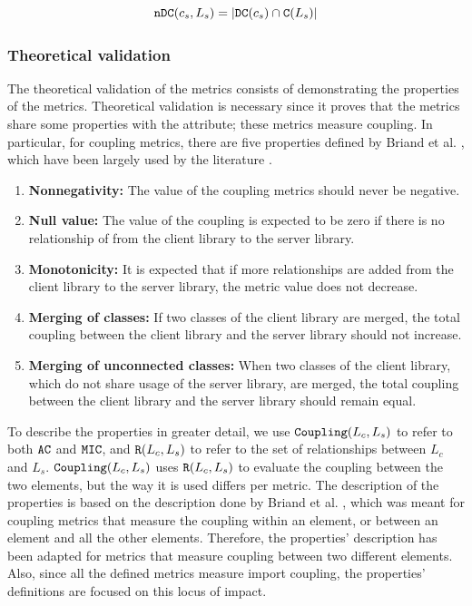 \begin{equation}
\label{eqn:ac-ndc}
    \verb|nDC|(c_s, L_s) = |\verb|DC|(c_s) \cap \verb|C|(L_s)|
\end{equation}

\subsubsection{Theoretical validation}
The theoretical validation of the metrics consists of demonstrating the properties of the metrics. Theoretical validation is necessary since it proves that the metrics share some properties with the attribute; these metrics measure coupling. In particular, for coupling metrics, there are five properties defined by Briand et al. \cite{briand1996property}, which have been largely used by the literature \cite{poshyvanyk2006conceptual, allen1999measuring, zhao2004measuring}.

\begin{enumerate}
  \item \textbf{Nonnegativity:} The value of the coupling metrics should never be negative.
  \item \textbf{Null value:} The value of the coupling is expected to be zero if there is no relationship of from the client library to the server library.
  \item \textbf{Monotonicity:} It is expected that if more relationships are added from the client library to the server library, the metric value does not decrease.
  \item \textbf{Merging of classes:} If two classes of the client library are merged, the total coupling between the client library and the server library should not increase.
  \item \textbf{Merging of unconnected classes:} When two classes of the client library, which do not share usage of the server library, are merged, the total coupling between the client library and the server library should remain equal.
\end{enumerate}

To describe the properties in greater detail, we use $\verb|Coupling|(L_c, L_s)$ to refer to both $\verb|AC|$ and $\verb|MIC|$, and $\verb|R|(L_c, L_s)$ to refer to the set of relationships between $L_c$ and $L_s$. $\verb|Coupling|(L_c, L_s)$ uses $\verb|R|(L_c, L_s)$ to evaluate the coupling between the two elements, but the way it is used differs per metric. The description of the properties is based on the description done by Briand et al. \cite{briand1996property}, which was meant for coupling metrics that measure the coupling within an element, or between an element and all the other elements. Therefore, the properties' description has been adapted for metrics that measure coupling between two different elements. Also, since all the defined metrics measure import coupling, the properties' definitions are focused on this locus of impact.

